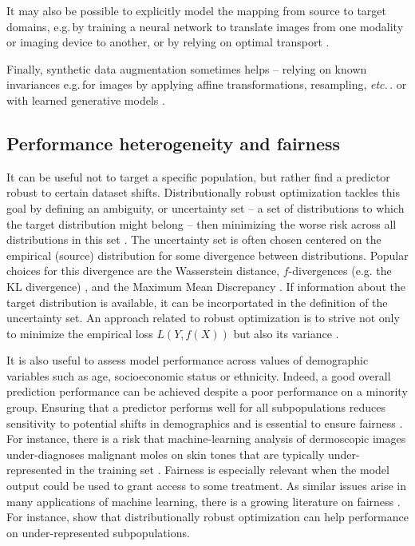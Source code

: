 \documentclass[twocolumn]{article}
\newcommand{\eg}{e.g.\,}
\newcommand{\etc}{\emph{etc.}\,}
\begin{document}
It may also be possible to explicitly model the mapping from source to target domains, \eg by training a neural network to translate images from one modality or imaging device to another, or by relying on optimal transport \citep{courty2016optimal}.

Finally, synthetic data augmentation sometimes helps -- relying on known invariances \eg for images by applying affine transformations, resampling, \etc. or with learned generative models \citep[e.g.][]{antoniou2017data}.

\subsection{Performance heterogeneity and fairness}

It can be useful not to target a specific population, but rather
find a predictor robust to certain dataset shifts.
%
Distributionally robust optimization tackles this goal by
defining an ambiguity, or uncertainty set -- a set of distributions to which the target distribution might belong -- then minimizing the worse risk across all distributions in this set \citep[see][for a review]{rahimian2019distributionally}.
%
The uncertainty set is often chosen centered on the empirical (source) distribution for some divergence between distributions.
%
Popular choices for this divergence are the Wasserstein distance, \(f\)-divergences (e.g. the KL divergence) \citep{duchi2018learning}, and the Maximum Mean Discrepancy \citep{zhu2020kernel}.
%
If information about the target distribution is available, it can be incorportated in the definition of the uncertainty set.
%
An approach related to robust optimization is to strive not only to minimize
the empirical loss \(L(Y, f(X))\) but also its variance
\cite{maurer2009empirical,namkoong2017variance}.


%
It is also useful to assess model performance across values of demographic
variables such as age, socioeconomic status or ethnicity. Indeed,
a good overall prediction performance can be achieved despite a poor
performance on a minority group. 
Ensuring that a
predictor performs well for all subpopulations reduces sensitivity to potential
shifts in demographics and is essential to ensure fairness
\citep{abbasi2020risk}.
%
For instance, there is a risk that machine-learning analysis of dermoscopic images under-diagnoses malignant moles on skin tones that are typically under-represented in the training set \cite{adamson2018machine}.
%
Fairness is especially relevant when the model output could be used to grant
access to some treatment.
%
As similar issues arise in many applications of
machine learning, there is a growing literature on fairness
\citep[see \eg][for an overview]{barocas-hardt-narayanan}.
%
For instance, 
\citet{duchi2018learning} show that distributionally robust optimization can
help performance on under-represented subpopulations.
\end{document}
